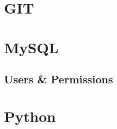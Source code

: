 \documentclass[11pt, noindent, letter]{article}
\begin{document}
\section{GIT}

\section{MySQL}
\subsection{Users \& Permissions}

\section{Python}
\end{document}
